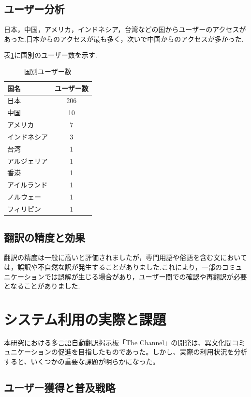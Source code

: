 \documentclass[b5paper,12pt,dvipdfmx]{jsreport}
\begin{document}
\subsection{ユーザー分析}
日本，中国，アメリカ，インドネシア，台湾などの国からユーザーのアクセスがあった.日本からのアクセスが最も多く，次いで中国からのアクセスが多かった.

表\ref{table:user-by-country}に国別のユーザー数を示す.

\begin{table}[H]
    \centering
    \begin{tabular}{|l|c|}
        \hline
        \textbf{国名} & \textbf{ユーザー数} \\
        \hline
        日本     & 206 \\
        中国     & 10 \\
        アメリカ & 7 \\
        インドネシア & 3 \\
        台湾 & 1 \\
        アルジェリア   & 1 \\
        香港 & 1  \\
        アイルランド   & 1  \\
        ノルウェー & 1  \\
        フィリピン   & 1  \\
        \hline
    \end{tabular}
    \caption{国別ユーザー数}
    \label{table:user-by-country}
\end{table}

\subsection{翻訳の精度と効果}
翻訳の精度は一般に高いと評価されましたが，専門用語や俗語を含む文においては，誤訳や不自然な訳が発生することがありました.これにより，一部のコミュニケーションでは誤解が生じる場合があり，ユーザー間での確認や再翻訳が必要となることがありました.


\section{システム利用の実際と課題}

本研究における多言語自動翻訳掲示板「The Channel」の開発は、異文化間コミュニケーションの促進を目指したものであった。しかし、実際の利用状況を分析すると、いくつかの重要な課題が明らかになった。

\subsection{ユーザー獲得と普及戦略}
\end{document}
